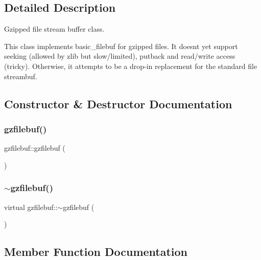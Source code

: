 \subsection{Detailed Description}
Gzipped file stream buffer class. 

This class implements basic\+\_\+filebuf for gzipped files. It doesn\textquotesingle{}t yet support seeking (allowed by zlib but slow/limited), putback and read/write access (tricky). Otherwise, it attempts to be a drop-\/in replacement for the standard file streambuf. 

\subsection{Constructor \& Destructor Documentation}
\mbox{\label{classgzfilebuf_aa08da094521bfa645427c0ae4c851504}} 
\subsubsection{\texorpdfstring{gzfilebuf()}{gzfilebuf()}}
{\footnotesize\ttfamily gzfilebuf\+::gzfilebuf (\begin{DoxyParamCaption}{ }\end{DoxyParamCaption})}

\mbox{\label{classgzfilebuf_acb95da35cfe68e16fc85cac62453451d}} 
\subsubsection{\texorpdfstring{$\sim$gzfilebuf()}{~gzfilebuf()}}
{\footnotesize\ttfamily virtual gzfilebuf\+::$\sim$gzfilebuf (\begin{DoxyParamCaption}{ }\end{DoxyParamCaption})\hspace{0.3cm}{\ttfamily [virtual]}}



\subsection{Member Function Documentation}
\mbox{\label{classgzfilebuf_a72889233c00bfd297ca01723cc4ed8fc}} 

